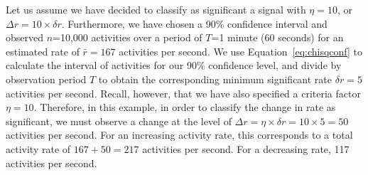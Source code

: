 \documentclass{article}
\begin{document}
Let us assume we have decided to classify as significant a signal with $\eta = 10$, or 
$\Delta r = 10 \times \delta r$. Furthermore, we have chosen a 90\% confidence interval 
and observed $n$=10,000 activities over a period of $T$=1 minute 
(60 seconds) for an estimated rate of $\bar r = 167$ activities per second. We use 
Equation~\ref{eq:chisqconf} to calculate the interval of activities for our 
90\% confidence level, and divide by observation period $T$ to obtain the corresponding 
minimum significant rate $\delta r = 5$ activities per second. Recall, however, 
that we have also specified a criteria factor $\eta = 10$. Therefore, in this example, 
in order to classify the change in rate as significant, we must observe a change at the 
level of $\Delta r =\eta \times \delta r = 10 \times 5 = 50$ activities per second. 
For an increasing activity rate, this corresponds to a total activity rate of 
$167 + 50 = 217$ activities per second. For a decreasing 
rate, 117 activities per second.





\end{document}

